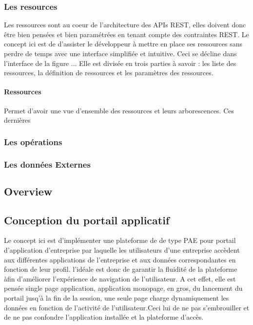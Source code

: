 \documentclass[a4paper,12pt]{article}
\begin{document}
\subsubsection{Les resources}
 Les ressources  sont au coeur de l'architecture des APIs REST, elles doivent donc être
 bien pensées et bien paramétrées en tenant compte des contraintes REST. Le concept ici est de
 d'assister le développeur à mettre en place ses ressources sans perdre de temps avec une interface simplifiée
 et intuitive. Ceci se décline dans l'interface de la figure ... Elle est divisée en trois parties à savoir : les liste des
 ressources, la définition de ressources et les paramètres des ressources.
 \paragraph{Ressources}
 Permet d'avoir une vue d'ensemble des ressources et leurs arborescences. Ces dernières 

\subsubsection{Les opérations}
\subsubsection{Les données Externes}%

\subsection{Overview}

\subsection{Conception du portail applicatif}%
 Le concept ici est
d'implémenter une plateforme de de type PAE pour portail d'application d'entreprise par laquelle
les utilisateurs d'une entreprise accèdent aux différentes
applications de l'entreprise et aux données correspondantes en
fonction de leur profil. l'idéale est donc de garantir la
fluidité de la plateforme àfin d'améliorer l'expérience de navigation de
l'utilisateur. A cet effet, elle est pensée single page application,
application monopage, en gros, du lancement du portail jusq'à la fin de la
session, une seule page charge dynamiquement les données en fonction
de l'activité de l'utilisateur.Ceci lui de ne pas
s'embrouiller et de ne pas confondre l'application installée et la
plateforme d'accès.  
   
\end{document}
